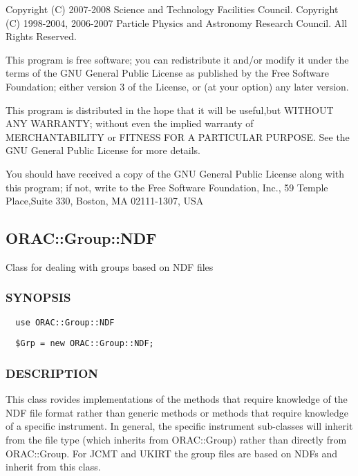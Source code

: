 \begin{description}
Copyright (C) 2007-2008 Science and Technology Facilities Council.
Copyright (C) 1998-2004, 2006-2007 Particle Physics and Astronomy Research
Council. All Rights Reserved.



This program is free software; you can redistribute it and/or modify it under
the terms of the GNU General Public License as published by the Free Software
Foundation; either version 3 of the License, or (at your option) any later
version.



This program is distributed in the hope that it will be useful,but WITHOUT ANY
WARRANTY; without even the implied warranty of MERCHANTABILITY or FITNESS FOR A
PARTICULAR PURPOSE. See the GNU General Public License for more details.



You should have received a copy of the GNU General Public License along with
this program; if not, write to the Free Software Foundation, Inc., 59 Temple
Place,Suite 330, Boston, MA  02111-1307, USA

\subsection{ORAC::Group::NDF\label{ORAC::Group::NDF}}


Class for dealing with groups based on NDF files

\subsubsection*{SYNOPSIS\label{ORAC::Group::NDF_SYNOPSIS}}
\begin{verbatim}
  use ORAC::Group::NDF
\end{verbatim}
\begin{verbatim}
  $Grp = new ORAC::Group::NDF;
\end{verbatim}
\subsubsection*{DESCRIPTION\label{ORAC::Group::NDF_DESCRIPTION}}


This class rovides implementations of the methods that require
knowledge of the NDF file format rather than generic methods or
methods that require knowledge of a specific instrument.  In general,
the specific instrument sub-classes will inherit from the file type
(which inherits from ORAC::Group) rather than directly from
ORAC::Group. For JCMT and UKIRT the group files are based on NDFs and
inherit from this class.




\end{description}
